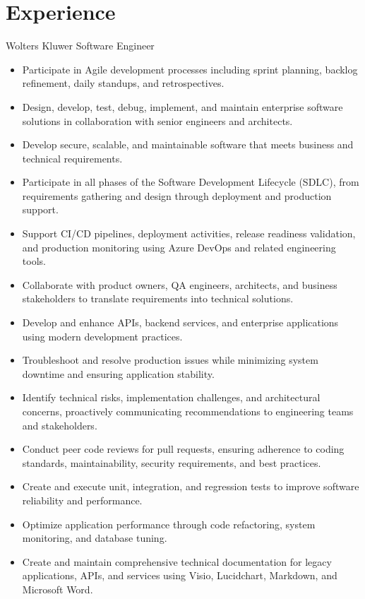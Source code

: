\documentclass[letterpaper]{twentysecondcv} %
\begin{document}
\section{Experience}
{} {Wolters Kluwer} {Software Engineer} {} 
\begin{itemize} \setlength \itemsep{0em} 
	\item Participate in Agile development processes including sprint planning, backlog refinement, daily standups, and retrospectives.
	\item Design, develop, test, debug, implement, and maintain enterprise software solutions in collaboration with senior engineers and architects.
	\item Develop secure, scalable, and maintainable software that meets business and technical requirements.
	\item Participate in all phases of the Software Development Lifecycle (SDLC), from requirements gathering and design through deployment and production support.
	\item Support CI/CD pipelines, deployment activities, release readiness validation, and production monitoring using Azure DevOps and related engineering tools.
	\item Collaborate with product owners, QA engineers, architects, and business stakeholders to translate requirements into technical solutions.
	\item Develop and enhance APIs, backend services, and enterprise applications using modern development practices.
	\item Troubleshoot and resolve production issues while minimizing system downtime and ensuring application stability.
	\item Identify technical risks, implementation challenges, and architectural concerns, proactively communicating recommendations to engineering teams and stakeholders.
	\item Conduct peer code reviews for pull requests, ensuring adherence to coding standards, maintainability, security requirements, and best practices.
	\item Create and execute unit, integration, and regression tests to improve software reliability and performance.
	\item Optimize application performance through code refactoring, system monitoring, and database tuning.
	\item Create and maintain comprehensive technical documentation for legacy applications, APIs, and services using Visio, Lucidchart, Markdown, and Microsoft Word.

\end{itemize}
\end{document}
